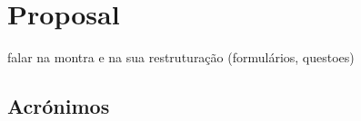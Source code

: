 \chapter{Proposal}
\label{chapter:proposal}

falar na montra e na sua restruturação (formulários, questoes)


\section{Acrónimos}
